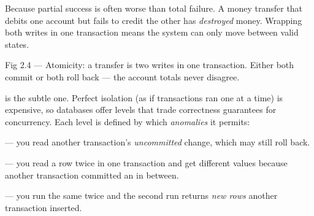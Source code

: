  Because partial success is often worse than total failure. A money transfer that debits one account but fails to credit the other has \emph{destroyed} money. Wrapping both writes in one transaction means the system can only move between valid states.

\begin{wbfigure}{Fig 2.4 — Atomicity: a transfer is two writes in one transaction. Either both commit or both roll back --- the account totals never disagree.}
\end{wbfigure}

  is the subtle one. Perfect isolation (as if transactions ran one at a time) is expensive, so databases offer levels that trade correctness guarantees for concurrency. Each level is defined by which \emph{anomalies} it permits:

\begin{wbitem}
  \item {} --- you read another transaction's \emph{uncommitted} change, which may still roll back.
  \item {} --- you read a row twice in one transaction and get different values because another transaction committed an  in between.
  \item {} --- you run the same  twice and the second run returns \emph{new rows} another transaction inserted.
\end{wbitem}

